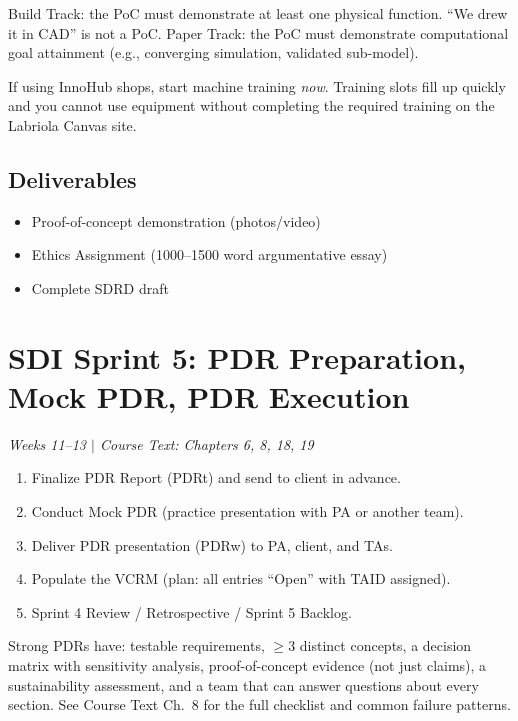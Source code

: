 \documentclass[11pt,letterpaper]{article}
\begin{document}
\begin{warnbox}
Build Track: the PoC must demonstrate at least one physical function. ``We drew it in CAD'' is not a PoC. Paper Track: the PoC must demonstrate computational goal attainment (e.g., converging simulation, validated sub-model).
\end{warnbox}

\begin{protip}
If using InnoHub shops, start machine training \emph{now}. Training slots fill up quickly and you cannot use equipment without completing the required training on the Labriola Canvas site.
\end{protip}

\subsection{Deliverables}
\begin{itemize}[nosep,leftmargin=1.5em]
\item Proof-of-concept demonstration (photos/video)
\item Ethics Assignment (1000--1500 word argumentative essay)
\item Complete SDRD draft
\end{itemize}


\section{SDI Sprint 5: PDR Preparation, Mock PDR, PDR Execution}
\textit{Weeks 11--13 $|$ Course Text: Chapters 6, 8, 18, 19}

\begin{priorities}
\begin{enumerate}[nosep]
\item Finalize PDR Report (PDRt) and send to client in advance.
\item Conduct Mock PDR (practice presentation with PA or another team).
\item Deliver PDR presentation (PDRw) to PA, client, and TAs.
\item Populate the VCRM (plan: all entries ``Open'' with TAID assigned).
\item Sprint 4 Review / Retrospective / Sprint 5 Backlog.
\end{enumerate}
\end{priorities}

\begin{faqbox}
Strong PDRs have: testable requirements, $\geq$3 distinct concepts, a decision matrix with sensitivity analysis, proof-of-concept evidence (not just claims), a sustainability assessment, and a team that can answer questions about every section. See Course Text Ch.~8 for the full checklist and common failure patterns.
\end{faqbox}
\end{document}
